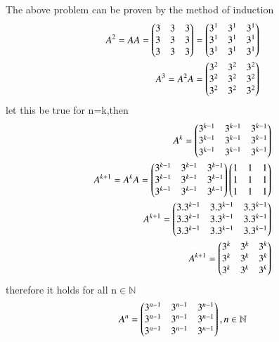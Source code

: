 The above problem can be proven by the method of induction
\begin{align} 
A^2 = AA = \begin{pmatrix}3 & 3 &3 \\3 & 3 &3\\3 & 3 &3\end{pmatrix}=\begin{pmatrix}3^1 & 3^1 &3^1 \\3^1 & 3^1 &3^1\\3^1 & 3^1 &3^1\end{pmatrix}\\
A^3 = A^2A = \begin{pmatrix}3^2 & 3^2 &3^2 \\3^2 & 3^2 &3^2\\3^2 & 3^2 &3^2\end{pmatrix}
\end{align}
let this be true for n=k,then
\begin{align} 
A^{k}  = \begin{pmatrix}3^{k-1} & 3^{k-1} &3^{k-1} \\3^{k-1} & 3^{k-1} &3^{k-1}\\3^{k-1} & 3^{k-1} &3^{k-1}\end{pmatrix}\\
A^{k+1} = A^{k}A= \begin{pmatrix}3^{k-1} & 3^{k-1} &3^{k-1} \\3^{k-1} & 3^{k-1} &3^{k-1}\\3^{k-1} & 3^{k-1} &3^{k-1}\end{pmatrix}\begin{pmatrix}1 & 1 &1 \\1 & 1 &1\\1 & 1 &1\end{pmatrix}\\
A^{k+1} =\begin{pmatrix}3.3^{k-1} & 3.3^{k-1} &3.3^{k-1} \\3.3^{k-1} & 3.3^{k-1} &3.3^{k-1}\\3.3^{k-1} & 3.3^{k-1} &3.3^{k-1}\end{pmatrix} \\A^{k+1}  = \begin{pmatrix}3^{k} & 3^{k} &3^{k} \\3^{k} & 3^{k} &3^{k}\\3^{k} & 3^{k} &3^{k}\end{pmatrix}
\end{align}
therefore it holds for all n$\in \mathbb{N}$
\begin{align}
A^n = \begin{pmatrix}3^{n-1} & 3^{n-1} &3^{n-1} \\3^{n-1} & 3^{n-1} &3^{n-1}\\3^{n-1} & 3^{n-1} &3^{n-1}\end{pmatrix}, n \in \mathbb{N}
\end{align}


